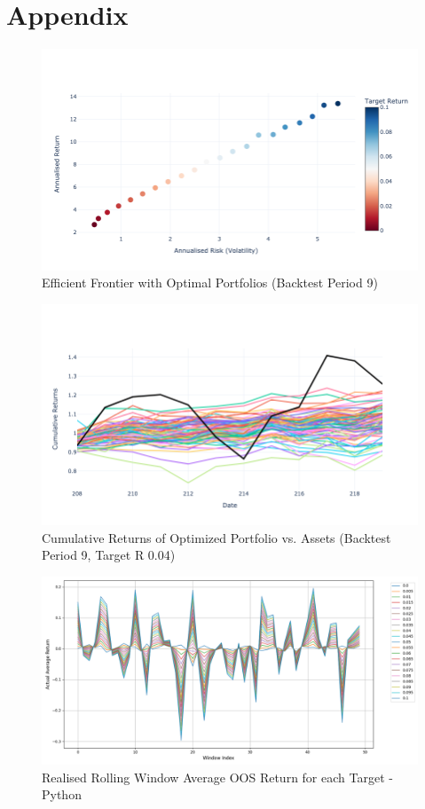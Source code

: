 \documentclass[12pt,twoside]{article}
\begin{document}
\newpage
\section{Appendix}
\begin{figure}[htbp!]
    \centering 
    \includegraphics[width = 1.0\hsize]{./figures/efficint_frontier.png} 
    \caption{Efficient Frontier with Optimal Portfolios (Backtest Period 9)} 
\label{fig:efficint_frontier}
\end{figure}
\begin{figure}[htbp!]
    \centering
    \includegraphics[width = 1.0\hsize]{./figures/Cumulative_Rets.png}
    \caption{Cumulative Returns of Optimized Portfolio vs. Assets (Backtest Period 9, Target R 0.04)}
\label{fig:Cumulative_Rets}
\end{figure}
\begin{figure}[htbp!]
\centering
\includegraphics[width = 1.0\hsize]{./figures/Realised_Rolling_Window_Average_OOS_Return.png} 
\caption{Realised Rolling Window Average OOS Return for each Target - Python} 
\label{fig:OOS_rets_python}
\end{figure}
\end{document}
